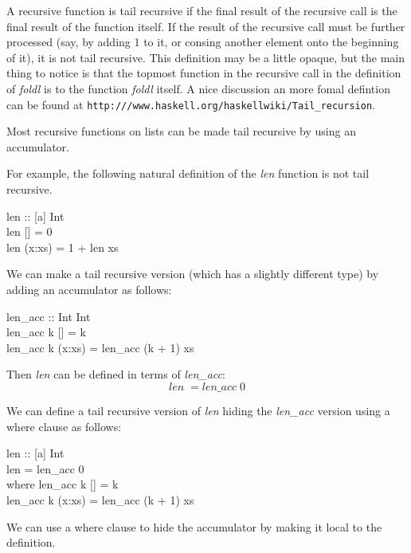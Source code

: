 \documentclass[11pt]{article}
\begin{document}
A recursive function is tail recursive if the final result of the recursive
call is the final result of the function itself. If the result of the recursive
call must be further processed (say, by adding 1 to it, or consing another
element onto the beginning of it), it is not tail recursive.  This definition
may be a little opaque, but the main thing to notice is that the topmost
function in the recursive call in the definition of {\it{foldl}} is to the
function {\it{foldl}} itself.  A nice discussion an more fomal defintion can be
found at {\tt{http:///www.haskell.org/haskellwiki/Tail\_recursion}}. 

Most recursive functions on lists can be made tail recursive by using an
accumulator.

For example, the following natural definition of the {\it{len}} function is not tail recursive.

\begin{program**}
\> len :: [a] \arrow Int\\
\> len [] = 0\\
\> len (x:xs) = 1 + len xs\\
\end{program**}

We can make a tail recursive version (which has a slightly different type) by
adding an accumulator as follows:

\begin{program**}
\> len\_acc :: Int \arrow [a]  \arrow Int\\
\> len\_acc k [] = k\\
\> len\_acc k (x:xs) = len\_acc (k + 1) xs \\
\end{program**}

\noindent{}Then {\it{len}} can be defined in terms of {\it{len\_acc}}:
\[ len\; = len\_acc\; 0\]

We can define a tail recursive version of {\it{len}} hiding the {\it{len\_acc}} version using a where clause as follows:
\begin{program**}
\> len :: [a] \arrow Int\\
\> len = len\_acc 0\\
\>    where len\_acc k [] = k\\
\>            len\_acc k (x:xs)  = len\_acc (k + 1) xs \\
\end{program**}



\noindent{}We can use a where clause to hide the accumulator by making it local to the definition.
\end{document}
